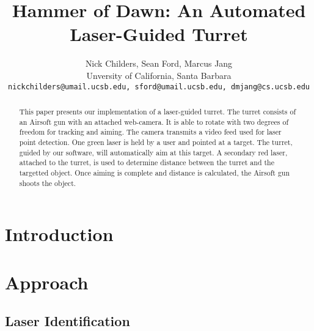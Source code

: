 \documentclass[10pt,twocolumn,letterpaper]{article}
\begin{document}
\title{Hammer of Dawn: An Automated Laser-Guided Turret}

\author{Nick Childers, Sean Ford, Marcus Jang\\
Unversity of California, Santa Barbara\\
{\tt\small nickchilders@umail.ucsb.edu, sford@umail.ucsb.edu, dmjang@cs.ucsb.edu}
}

\maketitle
\thispagestyle{empty}

\begin{abstract}
This paper presents our implementation of a laser-guided turret. The turret consists of an Airsoft gun with an attached web-camera.  It is able to rotate with two degrees of freedom for tracking and aiming.  The camera transmits a video feed used for laser point detection.  One green laser is held by a user and pointed at a target.  The turret, guided by our software, will automatically aim at this target.  A secondary red laser, attached to the turret, is used to determine distance between the turret and the targetted object.  Once aiming is complete and distance is calculated, the Airsoft gun shoots the object.
\end{abstract}

\section{Introduction}

\section{Approach}

\subsection{Laser Identification}
\end{document}
